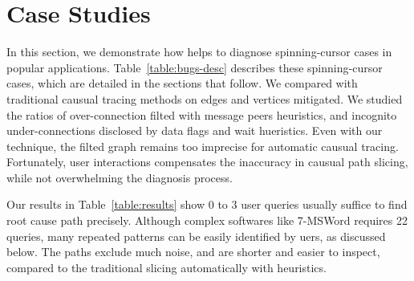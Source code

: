 \section{Case Studies}\label{sec:casestudy}

In this section, we demonstrate how \xxx helps to diagnose \nbug spinning-cursor
cases in \napps popular applications. Table~\ref{table:bugs-desc} describes
these spinning-cursor cases, which are detailed in the sections that follow. We
compared \xxx with traditional causual tracing methods on edges and vertices
\xxx mitigated. We studied the ratios of over-connection filted with message
peers heuristics, and incognito under-connections disclosed by data flags and
wait hueristics. Even with our technique, the filted graph remains too imprecise
for automatic causual tracing. Fortunately, user interactions compensates
the inaccuracy in causual path slicing, while not overwhelming the diagnosis
process.

Our results in Table~\ref{table:results} show 0 to 3 user queries usually
suffice to find root cause path precisely. Although complex softwares like
7-MSWord requires 22 queries, many repeated patterns can be easily identified
by uers, as discussed below. The paths exclude much noise, and are shorter
and easier to inspect, compared to the traditional slicing automatically with
heuristics.







